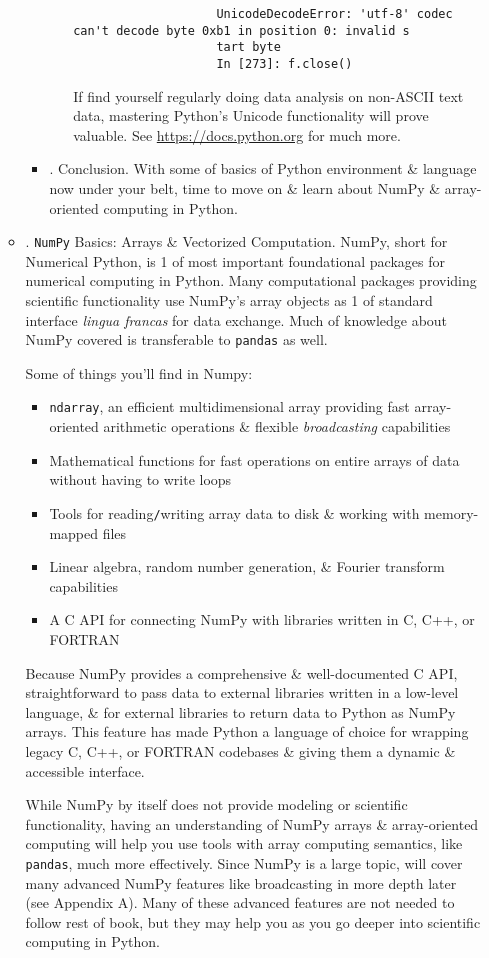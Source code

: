 \documentclass{article}
\begin{document}
\begin{enumerate}
\begin{itemize}
\begin{itemize}
\begin{itemize}
\begin{verbatim}
					UnicodeDecodeError: 'utf-8' codec can't decode byte 0xb1 in position 0: invalid s
					tart byte
					In [273]: f.close()
				\end{verbatim}
				If find yourself regularly doing data analysis on non-ASCII text data, mastering Python's Unicode functionality will prove valuable. See \url{https://docs.python.org} for much more.
			\end{itemize}
			\item {. Conclusion.} With some of basics of Python environment \& language now under your belt, time to move on \& learn about NumPy \& array-oriented computing in Python.
		\end{itemize}
		\item {. {\tt NumPy} Basics: Arrays \& Vectorized Computation.} NumPy, short for Numerical Python, is 1 of most important foundational packages for numerical computing in Python. Many computational packages providing scientific functionality use NumPy's array objects as 1 of standard interface {\it lingua francas} for data exchange. Much of knowledge about NumPy covered is transferable to {\tt pandas} as well.
		
		Some of things you'll find in Numpy:
		\begin{itemize}
			\item {\tt ndarray}, an efficient multidimensional array providing fast array-oriented arithmetic operations \& flexible {\it broadcasting} capabilities
			\item Mathematical functions for fast operations on entire arrays of data without having to write loops
			\item Tools for reading{\tt/}writing array data to disk \& working with memory-mapped files
			\item Linear algebra, random number generation, \& Fourier transform capabilities
			\item A C API for connecting NumPy with libraries written in C, C++, or FORTRAN
		\end{itemize}
		Because NumPy provides a comprehensive \& well-documented C API, straightforward to pass data to external libraries written in a low-level language, \& for external libraries to return data to Python as NumPy arrays. This feature has made Python a language of choice for wrapping legacy C, C++, or FORTRAN codebases \& giving them a dynamic \& accessible interface.
		
		While NumPy by itself does not provide modeling or scientific functionality, having an understanding of NumPy arrays \& array-oriented computing will help you use tools with array computing semantics, like {\tt pandas}, much more effectively. Since NumPy is a large topic, will cover many advanced NumPy features like broadcasting in more depth later (see Appendix A). Many of these advanced features are not needed to follow rest of book, but they may help you as you go deeper into scientific computing in Python.
		

\end{itemize}
\end{enumerate}
\end{document}
